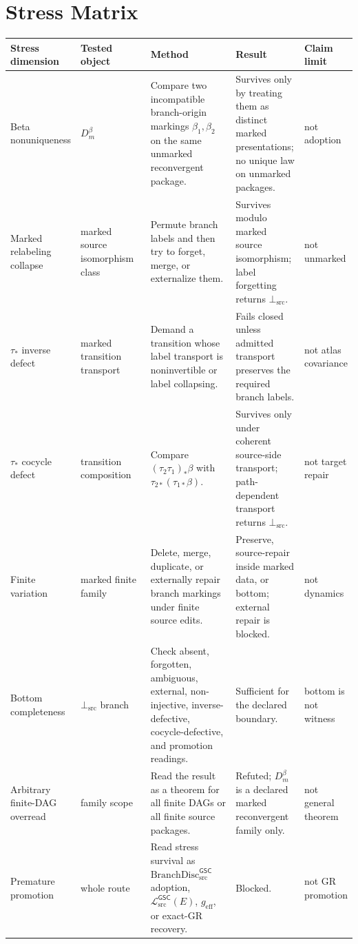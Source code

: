 \documentclass[11pt]{article}
\newcommand{\MetricData}{\mathcal{L}_{\mathrm{src}}^{\mathsf{GSC}}}
\newcommand{\BottomSrc}{\bot_{\mathrm{src}}}
\newcommand{\geff}{g_{\mathrm{eff}}}
\newcommand{\BranchDisc}{\mathrm{BranchDisc}_{\mathrm{src}}^{\mathsf{GSC}}}
\newcommand{\Dmbeta}{D_m^{\beta}}
\begin{document}
\section{Stress Matrix}

\begin{longtable}{p{0.17\linewidth}p{0.22\linewidth}p{0.29\linewidth}p{0.20\linewidth}p{0.12\linewidth}}
\toprule
Stress dimension & Tested object & Method & Result & Claim limit \\
\midrule
Beta nonuniqueness &
\(\Dmbeta\) &
Compare two incompatible branch-origin markings \(\beta_1,\beta_2\) on the
same unmarked reconvergent package. &
Survives only by treating them as distinct marked presentations; no unique
law on unmarked packages. &
not adoption \\
Marked relabeling collapse &
marked source isomorphism class &
Permute branch labels and then try to forget, merge, or externalize them. &
Survives modulo marked source isomorphism; label forgetting returns
\(\BottomSrc\). &
not unmarked \\
\(\tau_\ast\) inverse defect &
marked transition transport &
Demand a transition whose label transport is noninvertible or label
collapsing. &
Fails closed unless admitted transport preserves the required branch labels. &
not atlas covariance \\
\(\tau_\ast\) cocycle defect &
transition composition &
Compare \((\tau_2\tau_1)_\ast\beta\) with
\(\tau_{2\ast}(\tau_{1\ast}\beta)\). &
Survives only under coherent source-side transport; path-dependent transport
returns \(\BottomSrc\). &
not target repair \\
Finite variation &
marked finite family &
Delete, merge, duplicate, or externally repair branch markings under finite
source edits. &
Preserve, source-repair inside marked data, or bottom; external repair is
blocked. &
not dynamics \\
Bottom completeness &
\(\BottomSrc\) branch &
Check absent, forgotten, ambiguous, external, non-injective, inverse-defective,
cocycle-defective, and promotion readings. &
Sufficient for the declared boundary. &
bottom is not witness \\
Arbitrary finite-DAG overread &
family scope &
Read the result as a theorem for all finite DAGs or all finite source
packages. &
Refuted; \(\Dmbeta\) is a declared marked reconvergent family only. &
not general theorem \\
Premature promotion &
whole route &
Read stress survival as \(\BranchDisc\) adoption, \(\MetricData(E)\),
\(\geff\), or exact-GR recovery. &
Blocked. &
not GR promotion \\
\bottomrule
\end{longtable}
\end{document}
